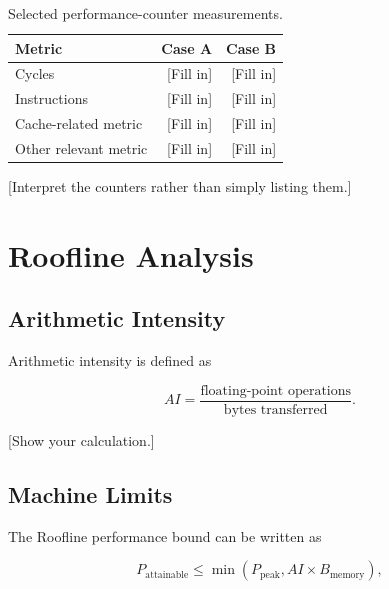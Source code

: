 \documentclass[11pt]{article}
\begin{document}
\begin{table}[H]
    \centering
    \caption{Selected performance-counter measurements.}
    \label{tab:counters}
    \begin{tabular}{lrr}
        \toprule
        \textbf{Metric} & \textbf{Case A} & \textbf{Case B} \\
        \midrule
        Cycles & [Fill in] & [Fill in] \\
        Instructions & [Fill in] & [Fill in] \\
        Cache-related metric & [Fill in] & [Fill in] \\
        Other relevant metric & [Fill in] & [Fill in] \\
        \bottomrule
    \end{tabular}
\end{table}

[Interpret the counters rather than simply listing them.]

\section{Roofline Analysis}

\subsection{Arithmetic Intensity}

Arithmetic intensity is defined as

\begin{equation}
    AI =
    \frac{\text{floating-point operations}}
         {\text{bytes transferred}}.
\end{equation}


[Show your calculation.]

\subsection{Machine Limits}

The Roofline performance bound can be written as

\begin{equation}
    P_{\mathrm{attainable}}
    \leq
    \min\left(
        P_{\mathrm{peak}},
        AI \times B_{\mathrm{memory}}
    \right),
\end{equation}
\end{document}
